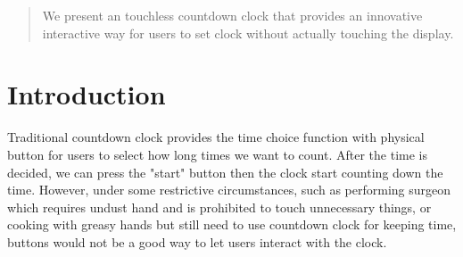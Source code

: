 \documentclass{sig-alternate-ipsn13}
\begin{document}
{%
}
\date{30 July 1999}

\maketitle
\begin{abstract}

We present an touchless countdown clock that provides an innovative interactive way for users to set clock without actually touching the display.
\end{abstract}

\section{Introduction}

Traditional countdown clock provides the time choice function with physical button for users to select how long times we want to count. After the time is decided, we can press the "start" button then the clock start counting down the time. However, under some restrictive circumstances, such as performing surgeon which requires undust hand and is prohibited to touch unnecessary things, or cooking with greasy hands but still need to use countdown clock for keeping time, buttons would not be a good way to let users interact with the clock. 
\end{document}
